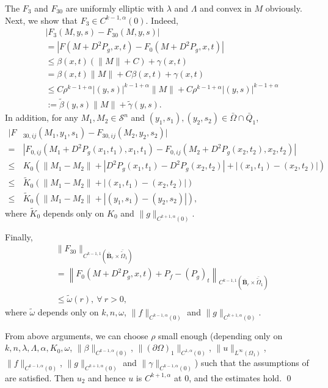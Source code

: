 \documentclass[preprint,12pt]{elsarticle}
\theoremstyle{definition}
\theoremstyle{remark}
\numberwithin{equation}{section}
\begin{document}
The $F_3$ and $F_{30}$ are uniformly elliptic with $\lambda$ and $\Lambda$ and convex in $M$ obviously. Next, we show that $F_3\in C^{k-1,\alpha}(0)$. Indeed,
\begin{equation*}
  \begin{aligned}
&|F_3(M,y,s)-F_{30}(M,y,s)|\\
&=\left|F\left(M+D^2P_g,x,t\right)
-F_{0}\left(M+D^2P_g,x,t\right) \right|\\
&\leq  \beta(x,t)\left(\|M\|+C \right)+\gamma(x,t)\\
&=\beta(x,t)\|M\|+C\beta(x,t)+\gamma(x,t)\\
&\leq C\rho^{k-1+\alpha} |(y,s)|^{k-1+\alpha}\|M\|
+C\rho^{k-1+\alpha}|(y,s)|^{k-1+\alpha}\\
&:=\tilde{\beta}(y,s)\|M\|+\tilde{\gamma}(y,s).
\end{aligned}
\end{equation*}
In addition, for any $M_1,M_2\in \mathcal{S}^{n}$ and $(y_1,s_1),(y_2,s_2)\in \bar\Omega\cap \bar Q_{1}$,
\begin{equation*}
  \begin{aligned}
|F&_{30,ij}(M_1,y_1,s_1)-F_{30,ij}(M_2,y_2,s_2)|\\
=&|F_{0,ij}(M_1+D^2P_g(x_1,t_1),x_1,t_1)-F_{0,ij}(M_2+D^2P_g(x_2,t_2),x_2,t_2)|\\
\leq& K_0 (\|M_1-M_2\|+|D^2P_g(x_1,t_1)-D^2P_g(x_2,t_2)|+|(x_1,t_1)-(x_2,t_2)|)\\
\leq &\tilde{K}_0(\|M_1-M_2\|+|(x_1,t_1)-(x_2,t_2)|)\\
\leq &\tilde{K}_0(\|M_1-M_2\|+|(y_1,s_1)-(y_2,s_2)|),
  \end{aligned}
\end{equation*}
where $\tilde{K}_0$ depends only on $K_0$ and $\|g\|_{C^{k+1,\alpha}(0)}$.

Finally,
\begin{equation*}
  \begin{aligned}
    &\|F_{30}\|_{C^{k-1,1}(\bar{\textbf{B}}_r\times \bar{\tilde\Omega}_1)}\\
&=\left \| F_0\left(M +D^2P_g,x,t\right)
+P_f-(P_g)_t  \right \|_{C^{k-1,1}(\bar{\textbf{B}}_r\times \bar{\tilde\Omega}_1)}\\
&\leq \tilde{\omega}(r),~\forall ~r>0,
  \end{aligned}
\end{equation*}
where $\tilde{\omega}$ depends only on $k,n,\omega$, $\|f\|_{C^{k-1,\alpha}(0)}$ and $\|g\|_{C^{k+1,\alpha}(0)}$.

From above arguments, we can choose $\rho$ small enough (depending only on $k,n,\lambda, \Lambda,\alpha,K_0,\omega$, $\|\beta\|_{C^{k-1,\alpha}(0)}$, $\|(\partial \Omega)_1\|_{C^{1,\alpha}(0)}$, $\|u\|_{L^{\infty}(\Omega_1)}$, $\|f\|_{C^{k-1,\alpha}(0)}$, $\|g\|_{C^{k+1,\alpha}(0)}$  and $\|\gamma\|_{C^{k-1,\alpha}(0)}$) such that the assumptions of  are satisfied. Then $u_2$ and hence $u$ is $C^{k+1,\alpha}$ at $0$, and the estimates  hold. \qed~\\
\end{document}
